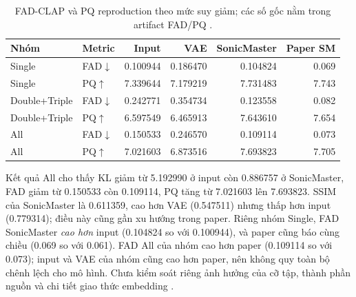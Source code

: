 \documentclass[10pt,a4paper]{article}
\begin{document}
\begin{table}[ht]
\centering\small
\caption{FAD-CLAP và PQ reproduction theo mức suy giảm; các số gốc nằm trong artifact FAD/PQ \cite{runreport}.}
\begin{tabular}{llrrrr}
\toprule
Nhóm & Metric & Input & VAE & SonicMaster & Paper SM\\
\midrule
Single & FAD$\downarrow$ & 0.100944 & 0.186470 & 0.104824 & 0.069\\
Single & PQ$\uparrow$ & 7.339644 & 7.179219 & 7.731483 & 7.743\\
Double+Triple & FAD$\downarrow$ & 0.242771 & 0.354734 & 0.123558 & 0.082\\
Double+Triple & PQ$\uparrow$ & 6.597549 & 6.465913 & 7.643610 & 7.654\\
All & FAD$\downarrow$ & 0.150533 & 0.246570 & 0.109114 & 0.073\\
All & PQ$\uparrow$ & 7.021603 & 6.873516 & 7.693823 & 7.705\\
\bottomrule
\end{tabular}
\end{table}

Kết quả All cho thấy KL giảm từ 5.192990 ở input còn 0.886757 ở SonicMaster, FAD giảm từ 0.150533 còn 0.109114, PQ tăng từ 7.021603 lên 7.693823. SSIM của SonicMaster là 0.611359, cao hơn VAE (0.547511) nhưng thấp hơn input (0.779314); điều này cũng gần xu hướng trong paper. Riêng nhóm Single, FAD SonicMaster \emph{cao hơn} input (0.104824 so với 0.100944), và paper cũng báo cùng chiều (0.069 so với 0.061). FAD All của nhóm cao hơn paper (0.109114 so với 0.073); input và VAE của nhóm cũng cao hơn paper, nên không quy toàn bộ chênh lệch cho mô hình. Chưa kiểm soát riêng ảnh hưởng của cỡ tập, thành phần nguồn và chi tiết giao thức embedding \cite{tables}.
\end{document}
